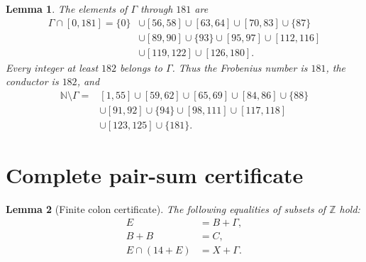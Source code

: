 \documentclass[10pt,a4paper]{amsart}
\newtheorem{lemma}{Lemma}
\newcommand{\NN}{\mathbb N}
\newcommand{\ZZ}{\mathbb Z}
\begin{document}
\begin{lemma}\label{lem:membership}
The elements of $\Gamma$ through $181$ are
\begin{equation}\label{eq:membership}
\begin{split}
\Gamma\cap[0,181]=\{0\}&\cup[56,58]\cup[63,64]\cup[70,83]\cup\{87\}\\
&\cup[89,90]\cup\{93\}\cup[95,97]\cup[112,116]\\
&\cup[119,122]\cup[126,180].
\end{split}
\end{equation}
Every integer at least $182$ belongs to $\Gamma$. Thus the Frobenius number is $181$, the conductor is $182$, and
\begin{equation}\label{eq:gaps}
\begin{split}
\NN\setminus\Gamma={}&[1,55]\cup[59,62]\cup[65,69]\cup[84,86]\cup\{88\}\\
&\cup[91,92]\cup\{94\}\cup[98,111]\cup[117,118]\\
&\cup[123,125]\cup\{181\}.
\end{split}
\end{equation}
\end{lemma}

\section{Complete pair-sum certificate}\label{app:pairs}

\begin{lemma}[Finite colon certificate]\label{lem:certificate}
The following equalities of subsets of $\ZZ$ hold:
\begin{align}
 E&=B+\Gamma,\label{eq:E}\\
 B+B&=C,\label{eq:BB}\\
 E\cap(14+E)&=X+\Gamma.\label{eq:intersection}
\end{align}
\end{lemma}
\end{document}
